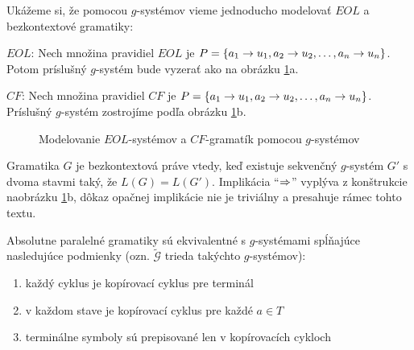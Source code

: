 \begin{priklad}
    Ukážeme si, že pomocou $g$-systémov vieme jednoducho modelovať
    $EOL$ a bezkontextové gramatiky:
    \begin{description}
    \item{$EOL$:} Nech množina pravidiel $EOL$ je
        $P=\{ a_1\rightarrow u_1,a_2\rightarrow u_2,\dots,a_n\rightarrow
        u_n\}$.
        Potom príslušný $g$-systém bude vyzerať ako na obrázku
        \ref{fig:eol-to-gsystem}a.

    \item{$CF$:} Nech množina pravidiel $CF$ je
        $P=\{a_1\rightarrow u_1, a_2\rightarrow u_2,\dots,a_n\rightarrow
        u_n\}$. Príslušný $g$-systém zostrojíme podľa obrázku
        \ref{fig:eol-to-gsystem}b.
    \end{description}

    \begin{figure}[!ht]
        \centering
        \caption{Modelovanie $EOL$-systémov a
                    $CF$-gramatík pomocou $g$-systémov}
        \label{fig:eol-to-gsystem}
    \end{figure}
\end{priklad}

\begin{poznamka}
Gramatika $G$ je bezkontextová práve vtedy, keď existuje sekvenčný
$g$-systém $G'$ s dvoma stavmi taký, že $L(G)=L(G')$. Implikácia
``$\Rightarrow$'' vyplýva z konštrukcie na\linebreak obrázku \ref{fig:eol-to-gsystem}b,
dôkaz opačnej implikácie nie je triviálny a presahuje rámec tohto
textu.
\end{poznamka}

\begin{veta}
Absolutne paralelné gramatiky sú ekvivalentné s $g$-systémami
spĺňajúce nasledujúce podmienky (ozn. $\tilde{\mathcal{G}}$ trieda
takýchto $g$-systémov):
\begin{enumerate}
  \item každý cyklus je kopírovací cyklus pre terminál
  \item v každom stave je kopírovací cyklus pre každé $a\in T$
  \item terminálne symboly sú prepisované len v kopírovacích cykloch
\end{enumerate}
\end{veta}

